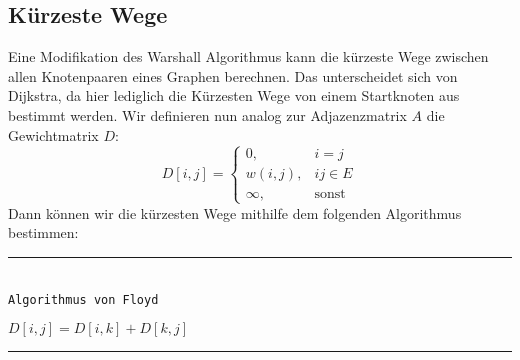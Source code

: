 \documentclass[a4paper, 12pt]{article}
\begin{document}
	\subsection{Kürzeste Wege}
	Eine Modifikation des Warshall Algorithmus kann die kürzeste Wege zwischen allen Knotenpaaren eines Graphen berechnen. Das unterscheidet sich von Dijkstra, da hier lediglich die Kürzesten Wege von einem Startknoten aus bestimmt werden. Wir definieren nun analog zur Adjazenzmatrix $A$ die Gewichtmatrix $D$: \[D[i,j] = \begin{cases}
		0, & i=j\\
		w(i,j), & ij \in E\\
		\infty, & \text{sonst}
	\end{cases}\]
	Dann können wir die kürzesten Wege mithilfe dem folgenden Algorithmus bestimmen: 
	\par\noindent\rule{\textwidth}{0.4pt}\\
	\texttt{Algorithmus von Floyd}
	\begin{algorithmic}[1]
		\State $D[i,j] = D[i,k] + D[k,j]$
		\EndIf
		\EndFor
		\EndFor
		\EndFor
	\end{algorithmic}
	\par\noindent\rule{\textwidth}{0.4pt}\\
\end{document}
